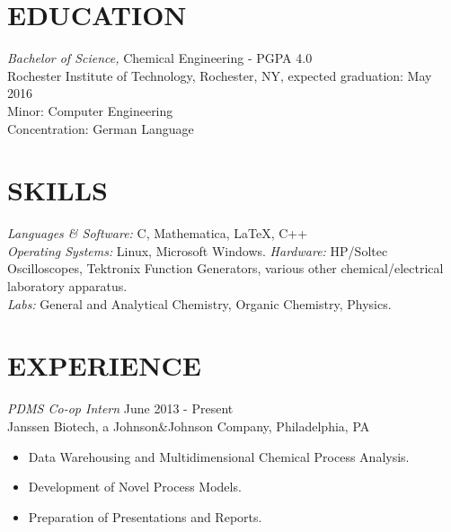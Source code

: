 \documentclass[line,margin]{res}
\begin{document}
\address{3241 Nathaniel Rochester Hall, Rochester, NY 14623}
\address{(315) 391-7268 - tmw4661@rit.edu}

\begin{resume}
 
\section{EDUCATION} {\sl Bachelor of Science,} Chemical Engineering - PGPA 4.0 \\
                Rochester Institute of Technology, Rochester, NY, 
                expected graduation: May 2016 \\
                Minor: Computer Engineering \\
                Concentration: German Language \\
\section{SKILLS} {\sl Languages \& Software:} C, Mathematica,
						\LaTeX, C++\\
                {\sl Operating Systems:} Linux, Microsoft Windows.
				{\sl Hardware:} HP/Soltec Oscilloscopes, Tektronix Function Generators, various other chemical/electrical laboratory apparatus.\\
				{\sl Labs:} General and Analytical Chemistry, Organic Chemistry, Physics.

\section{EXPERIENCE} {\sl PDMS Co-op Intern} \hfill June 2013 - Present \\
		Janssen Biotech, a Johnson\&Johnson Company,
		Philadelphia, PA
		\begin{itemize}  \itemsep -2pt
		\item   Data Warehousing and Multidimensional Chemical Process Analysis.
		\item   Development of Novel Process Models.
		\item   Preparation of Presentations and Reports.
		\end{itemize}


\end{resume}
\end{document}
